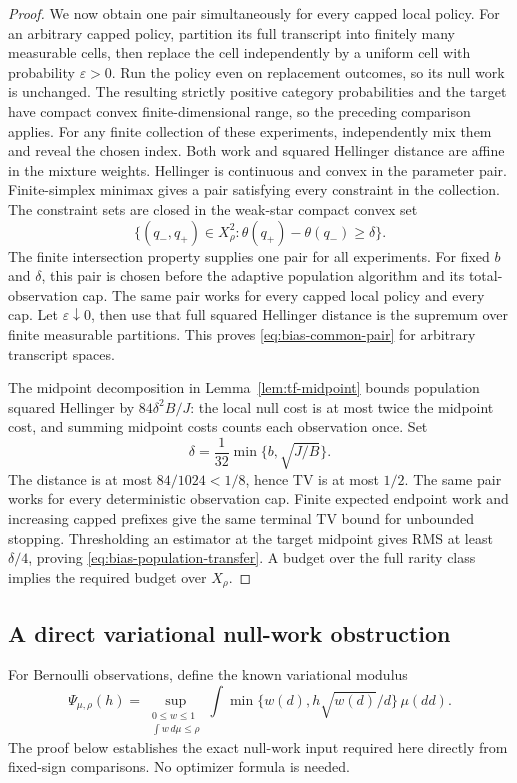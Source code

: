\begin{proof}
We now obtain one pair simultaneously for every capped local policy.
For an arbitrary capped policy, partition its full transcript into finitely
many measurable cells, then replace the cell independently by a uniform
cell with probability \(\varepsilon>0\).  Run the policy even on
replacement outcomes, so its null work is unchanged.  The resulting
strictly positive category probabilities and the target have compact
convex finite-dimensional range, so the preceding comparison applies.
For any finite collection of these experiments, independently mix them
and reveal the chosen index.  Both work and squared Hellinger distance
are affine in the mixture weights.  Hellinger is continuous and convex
in the parameter pair.  Finite-simplex minimax gives a pair satisfying
every constraint in the collection.  The constraint sets are closed in
the weak-star compact convex set
\[
 \{(q_-,q_+)\in X_\rho^2:
                 \theta(q_+)-\theta(q_-)\ge\delta\}.
\]
The finite intersection property supplies one pair for all experiments.
For fixed $b$ and $\delta$, this pair is chosen before the adaptive
population algorithm and its total-observation cap. The same pair
works for every capped local policy and every cap.
Let \(\varepsilon\downarrow0\), then use that full squared Hellinger
distance is the supremum over finite measurable partitions.  This proves
\eqref{eq:bias-common-pair} for arbitrary transcript spaces.

The midpoint decomposition in Lemma~\ref{lem:tf-midpoint}
bounds population squared Hellinger by
\(84\delta^2B/J\): the local null cost is at most twice the midpoint
cost, and summing midpoint costs counts each observation once.  Set
\[
 \delta=\frac1{32}\min\{b,\sqrt{J/B}\}.
\]
The distance is at most \(84/1024<1/8\), hence TV is at most \(1/2\).
The same pair works for every deterministic observation cap.  Finite
expected endpoint work and increasing capped prefixes give the same
terminal TV bound for unbounded stopping.  Thresholding an estimator at
the target midpoint gives RMS at least \(\delta/4\), proving
\eqref{eq:bias-population-transfer}.  A budget over the full rarity class
implies the required budget over \(X_\rho\).
\end{proof}

\subsection{A direct variational null-work obstruction}

For Bernoulli observations, define the known variational modulus \cite{repo}
\begin{equation}
 \Psi_{\mu,\rho}(h)=
 \sup_{\substack{0\le w\le1\\\int w\,d\mu\le\rho}}
 \int\min\{w(d),h\sqrt{w(d)}/d\}\,\mu(dd).
 \label{eq:inherited-psi}
\end{equation}
The proof below establishes the exact null-work input required here
directly from fixed-sign comparisons. No optimizer formula is needed.

